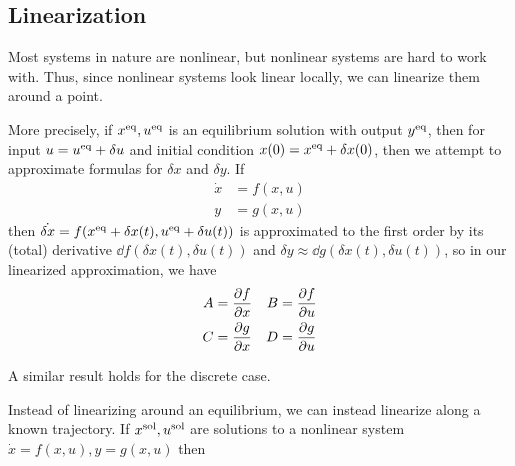 \subsection{Linearization}

Most systems in nature are nonlinear, but nonlinear systems are hard to work with. Thus, since nonlinear systems look linear locally, we can linearize them around a point. 

More precisely, if $x^\mathrm{eq}, u^\mathrm{eq}$ is an equilibrium solution with output $y^\mathrm{eq}$, then for input $u = u^\mathrm{eq} + \delta u$ and initial condition $x(0) = x^\mathrm{eq} + \delta x(0)$, then we attempt to approximate formulas for $\delta x$ and $\delta y$. If \begin{align*}
    \dot x &= f(x, u)\\
    y &= g(x, u)
\end{align*}
then $\dot {\delta x} = f(x^\mathrm{eq} + \delta x(t), u^\mathrm{eq} + \delta u(t))$ is approximated to the first order by its (total) derivative $\dd{f}(\delta x(t), \delta u(t))$ and $\delta y \approx \dd{g}(\delta x(t), \delta u(t))$, so in our linearized approximation, we have \begin{align*}
    A &= \pdv{f}{x} &B &= \pdv{f}{u}\\
    C &= \pdv{g}{x} &D &= \pdv{g}{u} 
\end{align*}

A similar result holds for the discrete case.

Instead of linearizing around an equilibrium, we can instead linearize along a known trajectory. If $x^\mathrm{sol}, u^\mathrm{sol}$ are solutions to a nonlinear system $\dot x = f(x, u), y = g(x, u)$ then 
